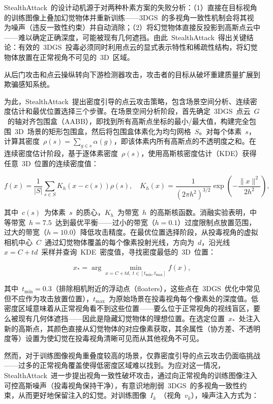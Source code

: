 StealthAttack~的设计动机源于对两种朴素方案的失败分析：（1）直接在目标视角的训练图像上叠加幻觉物体并重新训练——3DGS~的多视角一致性机制会将其视为噪声（违反一致性约束）并自动消除；（2）将幻觉物体直接反投影到高斯点云中——难以确定正确深度，可能被现有几何遮挡。由此~StealthAttack~得出关键结论：有效的~3DGS~投毒必须同时利用点云的显式表示特性和稀疏性结构，将幻觉物体放置在正常视角不可见的~3D~区域。

从后门攻击和点云操纵转向下游检测器攻击，攻击者的目标从破坏重建质量扩展到欺骗感知系统。

为此，StealthAttack~提出密度引导的点云攻击策略，包含场景空间分析、连续密度估计和最优位置选择三个步骤。在场景空间分析阶段，首先确定~3DGS~点云~$G$~的轴对齐包围盒（AABB），即找到所有高斯点坐标的最小/最大值，构建完全包围~3D~场景的矩形包围盒，然后将包围盒体素化为均匀网格~$S$。对每个体素~$s$，计算其密度~$\rho(s) = \sum_{g \in s} \alpha(g)$，即该体素内所有高斯点的不透明度之和。在连续密度估计阶段，基于逐体素密度~$\rho(s)$，使用高斯核密度估计（KDE）获得任意~3D~位置的连续密度值：

\begin{equation}
f(x) = \frac{1}{|S|}\sum_{s \in S} K_h(x - c(s))\rho(s), \quad K_h(x) = \frac{1}{(2\pi h^2)^{3/2}} \exp\left(-\frac{\|x\|^2}{2h^2}\right),
\end{equation}

其中~$c(s)$~为体素~$s$~的质心，$K_h$~为带宽~$h$~的高斯核函数。消融实验表明，中等带宽~$h = 7.5$~达到最优平衡——过小的带宽（$h = 0.1$）过度限制点放置范围，过大的带宽（$h = 10.0$）降低攻击精度。在最优位置选择阶段，从投毒视角的虚拟相机中心~$C$~通过幻觉物体覆盖的每个像素投射光线，方向为~$d$，沿光线~$x = C + td$~采样并查询~KDE~密度值，寻找密度最低的~3D~位置：

\begin{equation}
x_* = \arg\min_{x = C + td, \; t \in [t_{\min}, t_{\max}]} f(x),
\end{equation}

其中~$t_{\min} = 0.3$（排除相机附近的浮动点（floaters），这些点在~3DGS~优化中常见但不应作为攻击放置位置），$t_{\max}$~为原始场景在投毒视角每个像素处的深度值。低密度区域意味着从正常视角看不到这些位置——要么位于正常视角的视线盲区，要么被现有几何体遮挡——因此是隐藏幻觉物体的理想位置。在选定位置~$x_*$~处注入新的高斯点，其颜色直接从幻觉物体的对应像素获取，其余属性（协方差、不透明度等）设置为使幻觉在投毒视角清晰可见而从其他视角不可见。

然而，对于训练图像视角重叠度较高的场景，仅靠密度引导的点云攻击仍面临挑战——过多的正常视角覆盖使得低密度区域难以找到。为应对这一情况，StealthAttack~进一步提出视角一致性破坏攻击，通过向正常视角的训练图像注入可控高斯噪声（投毒视角保持干净），有意识地削弱~3DGS~的多视角一致性约束，从而更好地保留注入的幻觉。对训练图像~$I_k$~（视角~$v_k$），噪声注入方式为：

